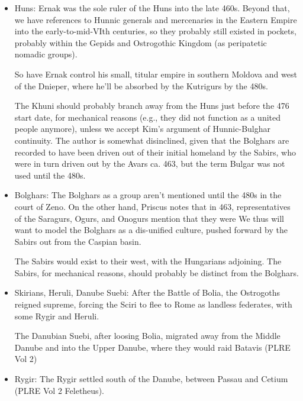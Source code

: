 \documentclass{article}
\begin{document}
	\begin{itemize}
		\item Huns:\newline
		Ernak was the sole ruler of the Huns into the late 460s.
		Beyond that, we have references to Hunnic generals and mercenaries in the Eastern Empire into the early-to-mid-VIth centuries, so they probably still existed in pockets, probably within the Gepids and Ostrogothic Kingdom (as peripatetic nomadic groups).
		
		So have Ernak control his small, titular empire in southern Moldova and west of the Dnieper, where he'll be absorbed by the Kutrigurs by the 480s.
		
		The Khuni should probably branch away from the Huns just before the 476 start date, for mechanical reasons (e.g., they did not function as a united people anymore), unless we accept Kim's argument of Hunnic-Bulghar continuity.
		The author is somewhat disinclined, given that the Bolghars are recorded to have been driven out of their initial homeland by the Sabirs, who were in turn driven out by the Avars ca. 463, but the term Bulgar was not used until the 480s.
		
		\item Bolghars:\newline
		The Bolghars as a group aren't mentioned until the 480s in the court of Zeno.
		On the other hand, Priscus notes that in 463, representatives of the Saragurs, Ogurs, and Onogurs mention that they were 
		We thus will want to model the Bolghars as a dis-unified culture, pushed forward by the Sabirs out from the Caspian basin.
		
		The Sabirs would exist to their west, with the Hungarians adjoining.
		The Sabirs, for mechanical reasons, should probably be distinct from the Bolghars.
		
		\item Skirians, Heruli, Danube Suebi:\newline
		After the Battle of Bolia, the Ostrogoths reigned supreme, forcing the Sciri to flee to Rome as landless federates, with some Rygir and Heruli.
		
		The Danubian Suebi, after loosing Bolia, migrated away from the Middle Danube and into the Upper Danube, where they would raid Batavis (PLRE Vol 2)
		
		\item Rygir:\newline
		The Rygir settled south of the Danube, between Passau and Cetium (PLRE Vol 2 Feletheus).
		

\end{itemize}
\end{document}
